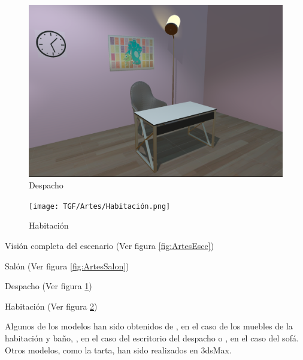 \documentclass[12pt, a4paper,twoside,titlepage]{book}
\begin{document}
\begin{figure}
	\centering
	\includegraphics[width=.9\linewidth]{TGF/Artes/Despachito.png}
	\caption{Despacho}
	\label{fig:ArtesDesp}
\end{figure}

\begin{figure}
	\centering
	\texttt{[image: TGF/Artes/Habitación.png]}
	\caption{Habitación}
	\label{fig:ArtesHab}
\end{figure}

Visión completa del escenario (Ver figura \ref{fig:ArtesEsce})

Salón (Ver figura \ref{fig:ArtesSalon})

Despacho (Ver figura \ref{fig:ArtesDesp})

Habitación (Ver figura \ref{fig:ArtesHab})

Algunos de los modelos han sido obtenidos de \cite{refBedBath}, en el caso de los muebles de la habitación y baño, \cite{refDesk}, en el caso del escritorio del despacho o \cite{refSofa}, en el caso del sofá. Otros modelos, como la tarta, han sido realizados en 3dsMax. 
\end{document}
